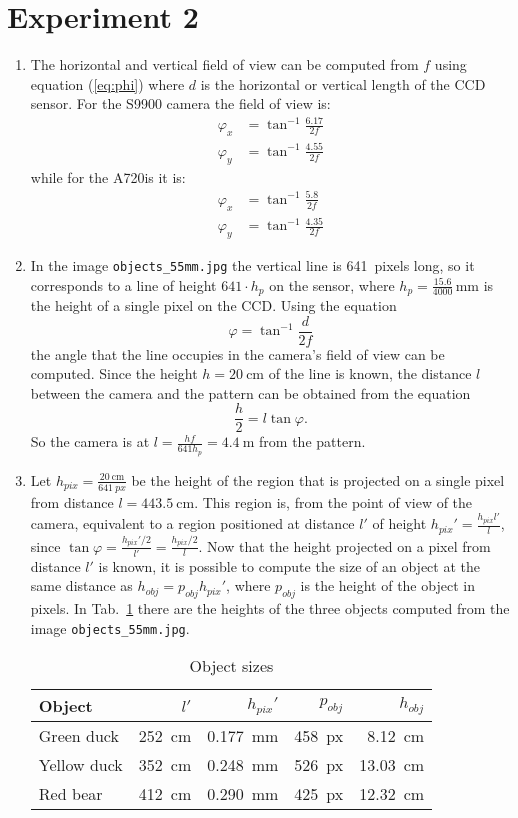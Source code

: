 \documentclass{article}
\begin{document}
\section*{Experiment 2}
\begin{enumerate}
\item The horizontal and vertical field of view can be computed from
  $f$ using equation (\ref{eq:phi}) where $d$ is the horizontal or
  vertical length of the CCD sensor. For the S9900 camera the field of
  view is:
  \begin{align*}
    \varphi_x &= \tan^{-1}\frac{6.17}{2f} \\
    \varphi_y &= \tan^{-1}\frac{4.55}{2f}
  \end{align*}
  while for the A720is it is:
  \begin{align*}
    \varphi_x &= \tan^{-1}\frac{5.8}{2f} \\
    \varphi_y &= \tan^{-1}\frac{4.35}{2f}
  \end{align*}
\item In the image \texttt{objects\_55mm.jpg} the vertical line is
  641~pixels long, so it corresponds to a line of height $641 \cdot
  h_p$ on the sensor, where $h_p = \frac{15.6}{4000}\,\si{\mm}$ is the
  height of a single pixel on the CCD. Using the equation
\[ \varphi = \tan^{-1} \frac{d}{2f} \]
the angle that the line occupies in the camera's field of view can be
computed. Since the height $h = \SI{20}{\cm}$ of the line is known,
the distance $l$ between the camera and the pattern can be obtained
from the equation
\[ \frac{h}{2} = l \tan \varphi . \]
So the camera is at $l = \frac{hf}{641 h_p} = \SI{4.4}{\m}$ from the
pattern.
\item Let $h_{pix} = \frac{\SI{20}{\cm}}{\SI{641}{px}}$ be the height
  of the region that is projected on a single pixel from distance $l =
  \SI{443.5}{\cm}$. This region is, from the point of view of the
  camera, equivalent to a region positioned at distance $l'$ of height
  $h_{pix}' = \frac{h_{pix}l'}{l}$, since $\tan \varphi =
  \frac{h_{pix}'/2}{l'} = \frac{h_{pix}/2}{l}$. Now that the height
  projected on a pixel from distance $l'$ is known, it is possible to
  compute the size of an object at the same distance as $h_{obj} =
  p_{obj}h_{pix}'$, where $p_{obj}$ is the height of the object in
  pixels. In Tab.~\ref{tab:objects} there are the heights of the three
  objects computed from the image \texttt{objects\_55mm.jpg}.
  \begin{table}[h]
    \centering
    \begin{tabular}{lrrrr}
      Object & $l'$ & $h_{pix}'$ & $p_{obj}$ & $h_{obj}$ \\
      \hline
      Green duck & \SI{252}{\cm} & \SI{0.177}{\mm} & \SI{458}{px} & \SI{8.12}{\cm} \\
      Yellow duck & \SI{352}{\cm} & \SI{0.248}{\mm} & \SI{526}{px} & \SI{13.03}{\cm} \\
      Red bear & \SI{412}{\cm} & \SI{0.290}{\mm} & \SI{425}{px} & \SI{12.32}{\cm}
    \end{tabular}
    \caption{Object sizes}
    \label{tab:objects}
  \end{table}
\end{enumerate}
\end{document}
